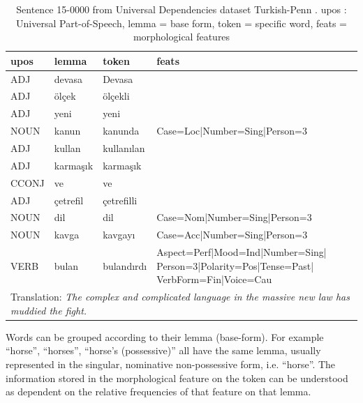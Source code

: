 \documentclass[USenglish]{article}
\begin{document}
\begin{table}[h]
    \centering
    \caption{Sentence 15-0000 from Universal Dependencies dataset Turkish-Penn \citep{kuzgun_2020_UD_turkish_penn}. upos : Universal Part-of-Speech, lemma = base form, token = specific word, feats = morphological features} %
    \label{tab:turkish_example}   
    \begin{tabular}{p{1.5cm}p{2cm}p{2cm}p{6cm}}
\toprule
	\textbf{upos}	&	\textbf{lemma}	&	\textbf{token}	&	\textbf{feats}	\\
    \midrule
	ADJ	&	devasa	&	Devasa	&	\\    \midrule
	ADJ	&	ölçek	&	ölçekli	&\\    \midrule
ADJ	&	yeni	&	yeni	&		\\    \midrule
	NOUN	&	kanun	&	kanunda	&	Case=Loc|Number=Sing|Person=3	\\    \midrule
	ADJ	&	kullan	&	kullanılan	&		\\    \midrule
ADJ	&	karmaşık	&	karmaşık	&\\    \midrule
CCONJ	&	ve	&	ve	&		\\    \midrule
ADJ	&	çetrefil	&	çetrefilli	&		\\    \midrule
	NOUN	&	dil	&	dil	&	Case=Nom|Number=Sing|Person=3	\\    \midrule
	NOUN	&	kavga	&	kavgayı	&	Case=Acc|Number=Sing|Person=3	\\    \midrule
	VERB	&	bulan	&	bulandırdı	&	Aspect=Perf|Mood=Ind|Number=Sing| Person=3|Polarity=Pos|Tense=Past| VerbForm=Fin|Voice=Cau	\\\midrule
   \multicolumn{4}{p{11cm}}{Translation: \textit{The complex and complicated language in the massive new law has muddied the fight.}}\\    \bottomrule


    \end{tabular}
\end{table}

Words can be grouped according to their lemma (base-form). 
For example ``horse'', ``horses'', ``horse's (possessive)'' all have the same lemma, usually represented in the singular, nominative non-possessive form, i.e. ``horse''.
The information stored in the morphological feature on the token can be understood as dependent on the relative frequencies of that feature on that lemma. 
\end{document}
